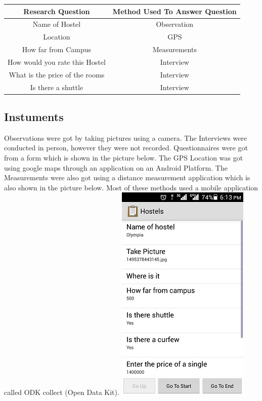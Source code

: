 \documentclass[12pt, a4paper]{article}
\begin{document}
\begin{center}
\begin{tabular}{||c | c||}
\hline \textbf{Research Question} & \textbf{Method Used To Answer Question}\\
[0.5ex]
\hline
\hline Name of Hostel & Observation\\
\hline Location & GPS\\
\hline How far from Campus & Measurements\\
\hline How would you rate this Hostel & Interview\\
\hline What is the price of the rooms & Interview\\
\hline Is there a shuttle & Interview\\
[0.5ex]
\hline 
\end{tabular}
\end{center}

\subsection{Instuments}
Observations were got by taking pictures using a camera. The Interviews were conducted in person, however they were not recorded. Questionnaires were got from a form which is shown in the picture below. The GPS Location was got using google maps through an application on an Android Platform. The Measurements were also got using a distance measurement application which is also shown in the picture below. Most of these methods used a mobile application called ODK collect (Open Data Kit).
\clearpage
\includegraphics{capture}
\end{document}
